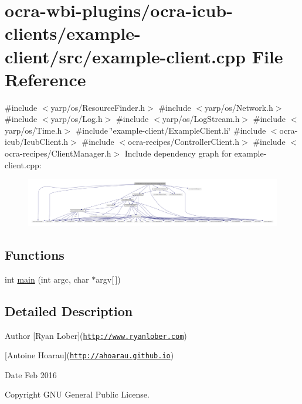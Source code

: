 \hypertarget{example-client_8cpp}{\section{ocra-\/wbi-\/plugins/ocra-\/icub-\/clients/example-\/client/src/example-\/client.cpp \-File \-Reference}
\label{example-client_8cpp}
}
{\ttfamily \#include $<$yarp/os/\-Resource\-Finder.\-h$>$}\*
{\ttfamily \#include $<$yarp/os/\-Network.\-h$>$}\*
{\ttfamily \#include $<$yarp/os/\-Log.\-h$>$}\*
{\ttfamily \#include $<$yarp/os/\-Log\-Stream.\-h$>$}\*
{\ttfamily \#include $<$yarp/os/\-Time.\-h$>$}\*
{\ttfamily \#include \char`\"{}example-\/client/\-Example\-Client.\-h\char`\"{}}\*
{\ttfamily \#include $<$ocra-\/icub/\-Icub\-Client.\-h$>$}\*
{\ttfamily \#include $<$ocra-\/recipes/\-Controller\-Client.\-h$>$}\*
{\ttfamily \#include $<$ocra-\/recipes/\-Client\-Manager.\-h$>$}\*
\-Include dependency graph for example-\/client.cpp\-:
\nopagebreak
\begin{figure}[H]
\begin{center}
\leavevmode
\includegraphics[width=350pt]{example-client_8cpp__incl}
\end{center}
\end{figure}
\subsection*{\-Functions}
\begin{DoxyCompactItemize}
\item 
int \hyperlink{example-client_8cpp_a0ddf1224851353fc92bfbff6f499fa97}{main} (int argc, char $\ast$argv\mbox{[}$\,$\mbox{]})
\end{DoxyCompactItemize}


\subsection{\-Detailed \-Description}
\begin{DoxyAuthor}{\-Author}
\mbox{[}\-Ryan \-Lober\mbox{]}(\href{http://www.ryanlober.com}{\tt http\-://www.\-ryanlober.\-com}) 

\mbox{[}\-Antoine \-Hoarau\mbox{]}(\href{http://ahoarau.github.io}{\tt http\-://ahoarau.\-github.\-io}) 
\end{DoxyAuthor}
\begin{DoxyDate}{\-Date}
\-Feb 2016 
\end{DoxyDate}
\begin{DoxyCopyright}{\-Copyright}
\-G\-N\-U \-General \-Public \-License. 
\end{DoxyCopyright}


